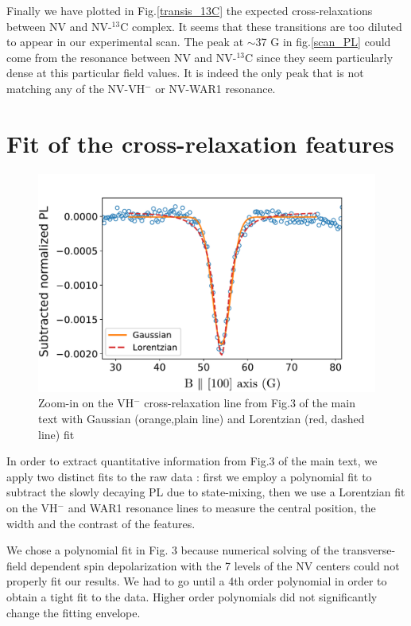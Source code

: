 \documentclass[9pt,twocolumn,twoside]{revtex4-1}
\begin{document}
Finally we have plotted in Fig.\ref{transis_13C} the expected cross-relaxations between NV and NV-$^{13}$C complex. It seems that these transitions are too diluted to appear in our experimental scan. The peak at $\sim$37 G in fig.\ref{scan_PL} could come from the resonance between NV and NV-$^{13}$C since they seem particularly dense at this particular field values.
It is indeed  the only peak that is not matching any of the NV-VH$^-$ or NV-WAR1 resonance.

\section{Fit of the cross-relaxation features}
\begin{figure}
\includegraphics[scale=0.5]{Gauss_vs_Lor_VH}
\caption{Zoom-in on the VH$^-$ cross-relaxation line from Fig.3 of the main text with Gaussian (orange,plain line) and Lorentzian (red, dashed line) fit}
\label{Gauss_vs_Lor}
\end{figure}
In order to extract quantitative information from Fig.3 of the main text, we apply two distinct fits to the raw data : first we employ a polynomial fit to subtract the slowly decaying PL due to state-mixing, then we use a Lorentzian fit on the VH$^-$ and WAR1 resonance lines to measure the central position, the width and the contrast of the features.

We chose a polynomial fit in Fig. 3 because numerical solving of the transverse-field dependent spin depolarization with the 7 levels of the NV centers could not properly fit our results. We had to go until a 4th order polynomial in order to obtain a tight fit to the data. Higher order polynomials did not significantly change the fitting envelope.
\end{document}

